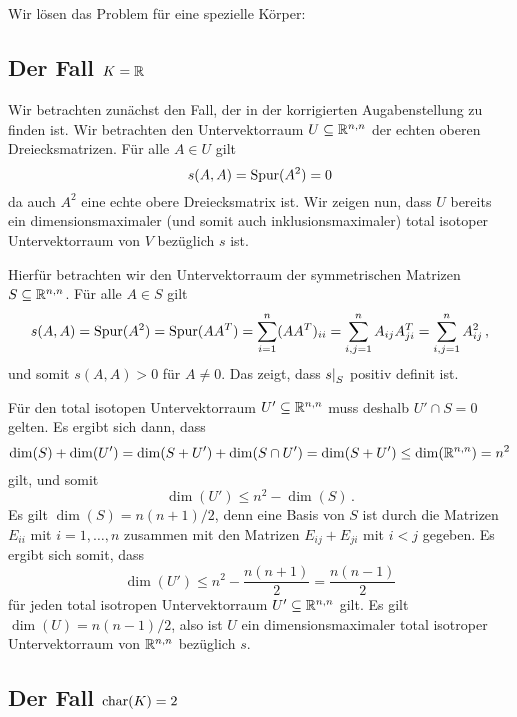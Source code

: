 \section{}

Wir lösen das Problem für eine spezielle Körper:


\subsection*{Der Fall $K = \mathbb{R}$}

Wir betrachten zunächst den Fall, der in der korrigierten Augabenstellung zu finden ist.
Wir betrachten den Untervektorraum $U \subseteq \mathbb{R}^{n, n}$ der echten oberen Dreiecksmatrizen.
Für alle $A \in U$ gilt
\[
    s(A,A)
  = \operatorname{Spur}(A^2)
  = 0
\]
da auch $A^2$ eine echte obere Dreiecksmatrix ist.
Wir zeigen nun, dass $U$ bereits ein dimensionsmaximaler (und somit auch inklusionsmaximaler) total isotoper Untervektorraum von $V$ bezüglich $s$ ist.

Hierfür betrachten wir den Untervektorraum der symmetrischen Matrizen $S \subseteq \mathbb{R}^{n, n}$.
Für alle $A \in S$ gilt
\[
    s(A,A)
  = \operatorname{Spur}(A^2)
  = \operatorname{Spur}(A A^T)
  = \sum_{i=1}^n (A A^T)_{ii}
  = \sum_{i,j=1}^n A_{ij} A^T_{ji}
  = \sum_{i,j=1}^n A_{ij}^2 \,,
\]
und somit $s(A,A) > 0$ für $A \neq 0$.
Das zeigt, dass $\restrict{s}{S}$ positiv definit ist.

Für den total isotopen Untervektorraum $U' \subseteq \mathbb{R}^{n, n}$ muss deshalb $U' \cap S = 0$ gelten.
Es ergibt sich dann, dass
\[
        \dim(S) + \dim(U')
  =     \dim(S + U') + \dim(S \cap U')
  =     \dim(S + U')
  \leq  \dim(\mathbb{R}^{n, n})
  =     n^2
\]
gilt, und somit
\[
        \dim(U') 
  \leq  n^2 - \dim(S) \,.
\]
Es gilt $\dim(S) = n(n+1)/2$, denn eine Basis von $S$ ist durch die Matrizen $E_{ii}$ mit $i = 1, \dotsc, n$ zusammen mit den Matrizen $E_{ij} + E_{ji}$ mit $i < j$ gegeben.
Es ergibt sich somit, dass
\[
        \dim(U')
  \leq  n^2 - \frac{n(n+1)}{2}
  =     \frac{n(n-1)}{2}
\]
für jeden total isotropen Untervektorraum $U' \subseteq \mathbb{R}^{n, n}$ gilt.
Es gilt $\dim(U) = n(n-1)/2$, also ist $U$ ein dimensionsmaximaler total isotroper Untervektorraum von $\mathbb{R}^{n, n}$ bezüglich $s$.





\subsection*{Der Fall $\operatorname{char}(K) = 2$}

